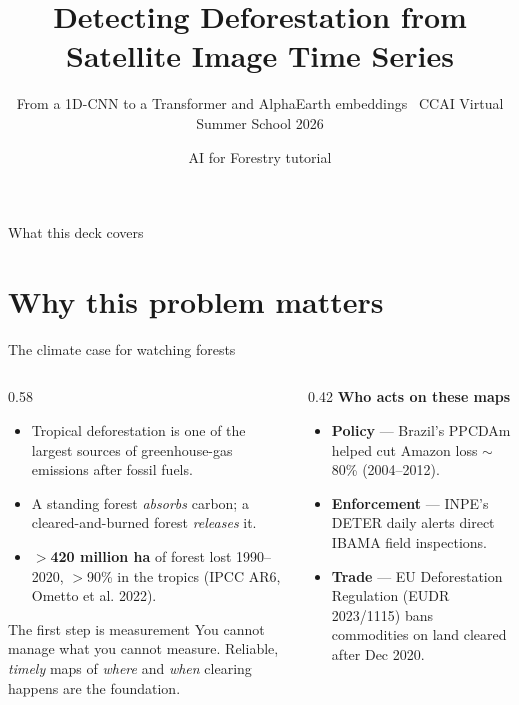 \documentclass[aspectratio=169,11pt]{beamer}
\title{Detecting Deforestation from Satellite Image Time Series}
\subtitle{From a 1D-CNN to a Transformer and AlphaEarth embeddings \textbullet\ CCAI Virtual Summer School 2026}
\author{AI for Forestry tutorial}
\date{}
\newcommand{\src}[1]{{\scriptsize\color{inkgrey}#1}}
\begin{document}
{
\maketitle}

\begin{frame}{What this deck covers}
  \tableofcontents
\end{frame}

\section{Why this problem matters}

\begin{frame}{The climate case for watching forests}
  \begin{columns}[T]
    \begin{column}{0.58\textwidth}
      \begin{itemize}
        \item Tropical deforestation is one of the largest sources of
              greenhouse-gas emissions \alert{after fossil fuels}.
        \item A standing forest \emph{absorbs} carbon; a cleared-and-burned
              forest \emph{releases} it.
        \item \textbf{$>$420 million ha} of forest lost 1990–2020, $>$90\% in
              the tropics \src{(IPCC AR6, Ometto et al. 2022)}.
      \end{itemize}
      \vspace{0.4em}
      \begin{alertblock}{The first step is measurement}
        You cannot manage what you cannot measure. Reliable, \emph{timely} maps
        of \emph{where} and \emph{when} clearing happens are the foundation.
      \end{alertblock}
    \end{column}
    \begin{column}{0.42\textwidth}
      \small
      \textbf{Who acts on these maps}
      \begin{itemize}
        \item \textbf{Policy} — Brazil's PPCDAm helped cut Amazon loss
              $\sim$80\% (2004–2012).
        \item \textbf{Enforcement} — INPE's DETER daily alerts direct IBAMA
              field inspections.
        \item \textbf{Trade} — EU Deforestation Regulation (EUDR 2023/1115)
              bans commodities on land cleared after Dec 2020.
      \end{itemize}
    \end{column}
  \end{columns}
\end{frame}
\end{document}
